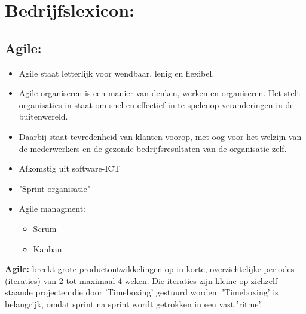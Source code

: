 \documentclass[12pt]{article}
\begin{document}
\section{Bedrijfslexicon:}
\subsection{Agile:}
\begin{itemize}
    \item Agile staat letterlijk voor wendbaar, lenig en flexibel.
    \item Agile organiseren is een manier van denken, werken en organiseren. Het stelt organisaties in staat om \underline{snel en effectief} in te spelenop veranderingen in de buitenwereld.
    \item Daarbij staat \underline{tevredenheid van klanten} voorop, met oog voor het welzijn van de mederwerkers en de gezonde bedrijfsresultaten van de organisatie zelf.
    \item Afkomstig uit software-ICT 
    \item "Sprint organisatie"
\end{itemize}
\begin{itemize}
    \item[]Agile managment:\begin{itemize}
        \item Scrum
        \item Kanban
    \end{itemize}
\end{itemize}
\textbf{Agile:} breekt grote productontwikkelingen op in korte, overzichtelijke periodes (iteraties) van 2 tot maximaal 4 weken. Die iteraties zijn kleine op zichzelf staande projecten die door 'Timeboxing' gestuurd worden. 'Timeboxing' is belangrijk, omdat sprint na sprint wordt getrokken in een vast 'ritme'.
\end{document}
